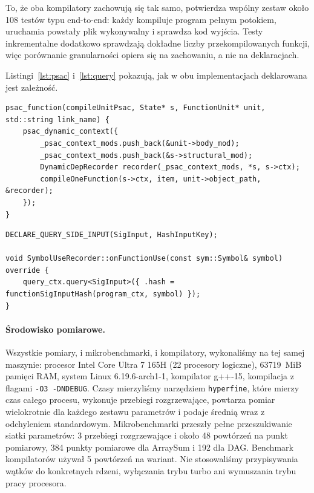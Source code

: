 \documentclass[11pt,a4paper]{article}
\begin{document}
To, że oba kompilatory zachowują się tak samo, potwierdza wspólny zestaw około
108 testów typu end-to-end: każdy kompiluje program pełnym potokiem, uruchamia
powstały plik wykonywalny i sprawdza kod wyjścia. Testy inkrementalne dodatkowo
sprawdzają dokładne liczby przekompilowanych funkcji, więc porównanie
granularności opiera się na zachowaniu, a nie na deklaracjach. %

Listingi~\ref{lst:psac} i~\ref{lst:query} pokazują, jak w obu implementacjach %
deklarowana jest zależność.
\begin{lstlisting}[caption={Kompilacja jednej funkcji jako obliczenie PSAC.
Zakres dynamiczny zbiera komórki odczytane w trakcie wykonania, więc zbiór
zależności wyliczany jest od nowa przy każdym przebiegu.},label={lst:psac}]
psac_function(compileUnitPsac, State* s, FunctionUnit* unit, std::string link_name) {
    psac_dynamic_context({
        _psac_context_mods.push_back(&unit->body_mod);
        _psac_context_mods.push_back(&s->structural_mod);
        DynamicDepRecorder recorder(_psac_context_mods, *s, s->ctx);
        compileOneFunction(s->ctx, item, unit->object_path, &recorder);
    });
}
\end{lstlisting}

\begin{lstlisting}[caption={Rejestracja zależności w wersji Query. Obserwator
wywoływany jest w miejscu użycia symbolu, więc funkcja zależy dokładnie od tych
sygnatur, stałych, klas i zmiennych globalnych, których naprawdę użyła.},
label={lst:query}]
DECLARE_QUERY_SIDE_INPUT(SigInput, HashInputKey);

void SymbolUseRecorder::onFunctionUse(const sym::Symbol& symbol) override {
    query_ctx.query<SigInput>({ .hash = functionSigInputHash(program_ctx, symbol) });
}
\end{lstlisting}

\paragraph{Środowisko pomiarowe.} Wszystkie pomiary, i mikrobenchmarki, i
kompilatory, wykonaliśmy na tej samej maszynie: procesor Intel Core Ultra 7 165H
(22 procesory logiczne), 63719~MiB pamięci RAM, system Linux 6.19.6-arch1-1,
kompilator g++-15, kompilacja z flagami \texttt{-O3 -DNDEBUG}. Czasy mierzyliśmy
narzędziem \texttt{hyperfine}, które mierzy czas całego procesu, wykonuje
przebiegi rozgrzewające, powtarza pomiar wielokrotnie dla każdego zestawu
parametrów i podaje średnią wraz z odchyleniem standardowym. Mikrobenchmarki
przeszły pełne przeszukiwanie siatki parametrów: 3 przebiegi rozgrzewające
i około 48 powtórzeń na punkt pomiarowy, 384 punkty pomiarowe dla ArraySum i 192
dla DAG. Benchmark kompilatorów używał 5 powtórzeń na wariant. Nie stosowaliśmy
przypisywania wątków do konkretnych rdzeni, wyłączania trybu turbo ani %
wymuszania trybu pracy procesora.
\end{document}
